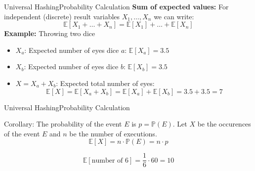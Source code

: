 
\begin{frame}{Universal Hashing}{Probability Calculation}
  \textbf{Sum of expected values:}
  For independent (discrete) result variables $X_1,\dots,X_n$ we can write:
    \[\mathbb{E}\left[X_1+\dots+X_n\right]
      = \mathbb{E}[X_1] + \dots + \mathbb{E}[X_n]\]
  \textbf{Example:} Throwing two dice
  \begin{itemize}
    \item
      $X_a$: Expected number of eyes dice $a$: $\mathbb{E}[X_a] = 3.5$
    \item
      $X_b$: Expected number of eyes dice $b$: $\mathbb{E}[X_b] = 3.5$
    \item
      $X = X_a + X_b$: Expected total number of eyes:
      \[\mathbb{E}[X]
        = \mathbb{E}[X_a + X_b]
        = \mathbb{E}[X_a] + \mathbb{E}[X_b] = 3.5 + 3.5 = 7\]
  \end{itemize}
\end{frame}


\begin{frame}{Universal Hashing}{Probability Calculation}
  \begin{block}{Corollary:}
    The probability of the event $E$ is $p = \mathbb{P}(E)$.
    Let $X$ be the occurences of the event $E$ and $n$ be the number
    of executions.
    \[\mathbb{E}[X] = n \cdot \mathbb{P}(E) = n \cdot p\]
  \end{block}
  \begin{example}
    \[\mathbb{E}\left[\text{number of 6}\right] = \frac{1}{6} \cdot 60 = 10\]
  \end{example}
\end{frame}


